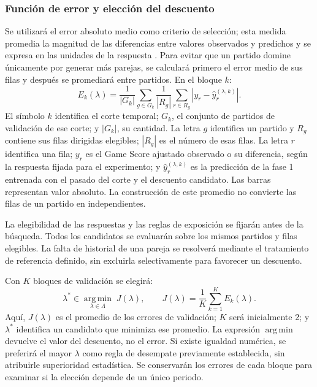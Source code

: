 \subsubsection*{Función de error y elección del descuento}
Se utilizará el error absoluto medio como criterio de selección; esta medida promedia la magnitud de las diferencias entre valores observados y predichos y se expresa en las unidades de la respuesta \cite{sklearnMAETemporal}. Para evitar que un partido domine únicamente por generar más parejas, se calculará primero el error medio de sus filas y después se promediará entre partidos. En el bloque $k$:
\begin{equation}
 E_k(\lambda)=\frac{1}{|G_k|}\sum_{g\in G_k}
 \frac{1}{|R_g|}\sum_{r\in R_g}
 \left|y_r-\widehat y_r^{(\lambda,k)}\right|.
 \label{eq:error-validacion-613}
\end{equation}
El símbolo $k$ identifica el corte temporal; $G_k$, el conjunto de partidos de validación de ese corte; y $|G_k|$, su cantidad. La letra $g$ identifica un partido y $R_g$ contiene sus filas dirigidas elegibles; $|R_g|$ es el número de esas filas. La letra $r$ identifica una fila; $y_r$ es el Game Score ajustado observado o su diferencia, según la respuesta fijada para el experimento; y $\widehat y_r^{(\lambda,k)}$ es la predicción de la fase 1 entrenada con el pasado del corte y el descuento candidato. Las barras representan valor absoluto. La construcción de este promedio no convierte las filas de un partido en independientes.

La elegibilidad de las respuestas y las reglas de exposición se fijarán antes de la búsqueda. Todos los candidatos se evaluarán sobre los mismos partidos y filas elegibles. La falta de historial de una pareja se resolverá mediante el tratamiento de referencia definido, sin excluirla selectivamente para favorecer un descuento.

Con $K$ bloques de validación se elegirá:
\begin{equation}
 \lambda^*\in\underset{\lambda\in\Lambda}{\operatorname{arg\,min}}\;J(\lambda),
 \qquad J(\lambda)=\frac{1}{K}\sum_{k=1}^{K}E_k(\lambda).
 \label{eq:optimizacion-pesos-613}
\end{equation}
Aquí, $J(\lambda)$ es el promedio de los errores de validación; $K$ será inicialmente 2; y $\lambda^*$ identifica un candidato que minimiza ese promedio. La expresión $\operatorname{arg\,min}$ devuelve el valor del descuento, no el error. Si existe igualdad numérica, se preferirá el mayor $\lambda$ como regla de desempate previamente establecida, sin atribuirle superioridad estadística. Se conservarán los errores de cada bloque para examinar si la elección depende de un único periodo.

